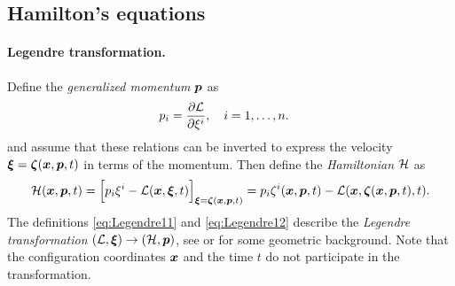 \subsection{Hamilton's equations}\label{sec:HamiltonsEquations}
\paragraph{Legendre transformation.}
Define the \textit{generalized momentum} $\genMomentum$ as
\begin{align}\label{eq:Legendre11}
 \genMomentumCoeff{\LidxI} &= \pdiff[\Lagrangian]{\sysVelCoeff{\LidxI}}, \quad \LidxI = 1,\ldots,\dimConfigSpace
 .
\end{align}
and assume that these relations can be inverted to express the velocity $\sysVel = \tuple{\zeta}(\sysCoord, \genMomentum, t)$ in terms of the momentum.
Then define the \textit{Hamiltonian} $\Hamiltonian$ as
\begin{align}\label{eq:Legendre12}
 \Hamiltonian(\sysCoord, \genMomentum, t) 
 = \Big[ \genMomentumCoeff{\LidxI} \sysVelCoeff{\LidxI} - \Lagrangian(\sysCoord, \sysVel, t) \Big]_{\sysVel = \tuple{\zeta}(\sysCoord, \genMomentum, t)}
 = \genMomentumCoeff{\LidxI} \zeta^{\LidxI}(\sysCoord, \genMomentum, t) - \Lagrangian(\sysCoord, \tuple{\zeta}(\sysCoord, \genMomentum, t), t)
 .
\end{align}
The definitions \eqref{eq:Legendre11} and \eqref{eq:Legendre12} describe the \textit{Legendre transformation} $(\Lagrangian, \sysVel) \rightarrow (\Hamiltonian, \genMomentum)$, see \cite[ch.\,VI.1]{Lanczos:Variational} or \cite[sec.\,14]{Arnold:MathematicalMethodsOfClassicalMechanics} for some geometric background.
Note that the configuration coordinates $\sysCoord$ and the time $t$ do not participate in the transformation.

